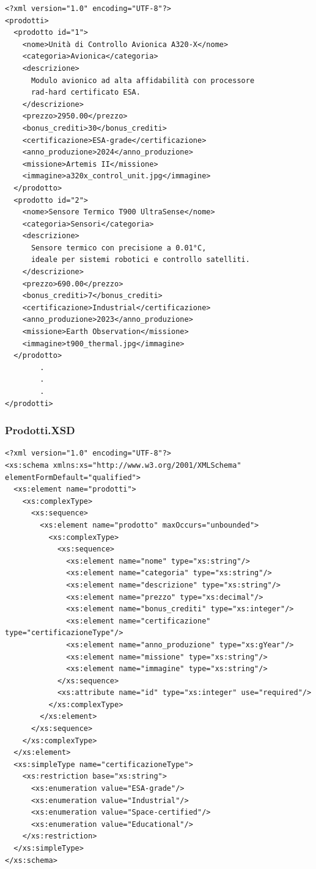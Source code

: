 \documentclass[a4paper,12pt]{report}
\begin{document}
\begin{lstlisting}
<?xml version="1.0" encoding="UTF-8"?>
<prodotti>
  <prodotto id="1">
    <nome>Unità di Controllo Avionica A320-X</nome>
    <categoria>Avionica</categoria>
    <descrizione>
      Modulo avionico ad alta affidabilità con processore
      rad-hard certificato ESA.
    </descrizione>
    <prezzo>2950.00</prezzo>
    <bonus_crediti>30</bonus_crediti>
    <certificazione>ESA-grade</certificazione>
    <anno_produzione>2024</anno_produzione>
    <missione>Artemis II</missione>
    <immagine>a320x_control_unit.jpg</immagine>
  </prodotto>
  <prodotto id="2">
    <nome>Sensore Termico T900 UltraSense</nome>
    <categoria>Sensori</categoria>
    <descrizione>
      Sensore termico con precisione a 0.01°C,
      ideale per sistemi robotici e controllo satelliti.
    </descrizione>
    <prezzo>690.00</prezzo>
    <bonus_crediti>7</bonus_crediti>
    <certificazione>Industrial</certificazione>
    <anno_produzione>2023</anno_produzione>
    <missione>Earth Observation</missione>
    <immagine>t900_thermal.jpg</immagine>
  </prodotto>
        .
        .
        .
</prodotti>
\end{lstlisting}

\subsubsection*{Prodotti.XSD}

{\footnotesize
\begin{lstlisting}
<?xml version="1.0" encoding="UTF-8"?>
<xs:schema xmlns:xs="http://www.w3.org/2001/XMLSchema" elementFormDefault="qualified">
  <xs:element name="prodotti">
    <xs:complexType>
      <xs:sequence>
        <xs:element name="prodotto" maxOccurs="unbounded">
          <xs:complexType>
            <xs:sequence>
              <xs:element name="nome" type="xs:string"/>
              <xs:element name="categoria" type="xs:string"/>
              <xs:element name="descrizione" type="xs:string"/>
              <xs:element name="prezzo" type="xs:decimal"/>
              <xs:element name="bonus_crediti" type="xs:integer"/>
              <xs:element name="certificazione" type="certificazioneType"/>
              <xs:element name="anno_produzione" type="xs:gYear"/>
              <xs:element name="missione" type="xs:string"/>
              <xs:element name="immagine" type="xs:string"/>
            </xs:sequence>
            <xs:attribute name="id" type="xs:integer" use="required"/>
          </xs:complexType>
        </xs:element>
      </xs:sequence>
    </xs:complexType>
  </xs:element>
  <xs:simpleType name="certificazioneType">
    <xs:restriction base="xs:string">
      <xs:enumeration value="ESA-grade"/>
      <xs:enumeration value="Industrial"/>
      <xs:enumeration value="Space-certified"/>
      <xs:enumeration value="Educational"/>
    </xs:restriction>
  </xs:simpleType>
</xs:schema>
\end{lstlisting}
}
\end{document}

